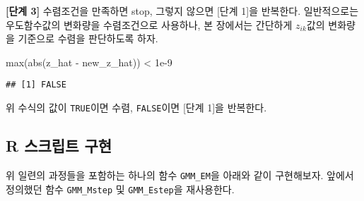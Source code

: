 \documentclass[
]{book}
\newenvironment{Shaded}{\begin{snugshade}}{\end{snugshade}}
\newcommand{\FloatTok}[1]{\textcolor[rgb]{0.00,0.00,0.81}{#1}}
\newcommand{\FunctionTok}[1]{\textcolor[rgb]{0.00,0.00,0.00}{#1}}
\newcommand{\NormalTok}[1]{#1}
\newcommand{\SpecialCharTok}[1]{\textcolor[rgb]{0.00,0.00,0.00}{#1}}
\begin{document}
\textbf{{[}단계 3{]}} 수렴조건을 만족하면 stop, 그렇지 않으면 {[}단계 1{]}을 반복한다. 일반적으로는 우도함수값의 변화량을 수렴조건으로 사용하나, 본 장에서는 간단하게 \(z_{ik}\)값의 변화량을 기준으로 수렴을 판단하도록 하자.

\begin{Shaded}
\begin{Highlighting}[]
\FunctionTok{max}\NormalTok{(}\FunctionTok{abs}\NormalTok{(z\_hat }\SpecialCharTok{{-}}\NormalTok{ new\_z\_hat)) }\SpecialCharTok{\textless{}} \FloatTok{1e{-}9}
\end{Highlighting}
\end{Shaded}

\begin{verbatim}
## [1] FALSE
\end{verbatim}

위 수식의 값이 \texttt{TRUE}이면 수렴, \texttt{FALSE}이면 {[}단계 1{]}을 반복한다.

\hypertarget{model-based-clustering-script-implement}{%
\subsection{R 스크립트 구현}\label{model-based-clustering-script-implement}}

위 일련의 과정들을 포함하는 하나의 함수 \texttt{GMM\_EM}을 아래와 같이 구현해보자. 앞에서 정의했던 함수 \texttt{GMM\_Mstep} 및 \texttt{GMM\_Estep}을 재사용한다.
\end{document}
